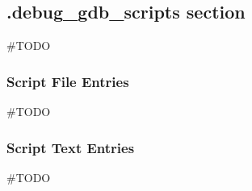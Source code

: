 \subsection{.debug\_gdb\_scripts section}

\#TODO

\subsubsection{Script File Entries}
\#TODO

\subsubsection{Script Text Entries}
\#TODO
